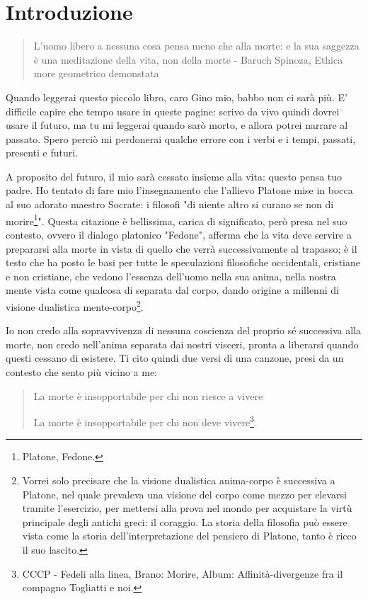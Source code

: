 \chapter*{Introduzione}

\begin{quotation}
	\small L'uomo libero a nessuna cosa pensa meno che alla morte: e la sua saggezza è una meditazione della vita, non della morte - Baruch Spinoza, Ethica more geometrico demonstata
\end{quotation}

Quando leggerai questo piccolo libro, caro Gino mio, babbo non ci sarà più. E' difficile capire che tempo usare in queste pagine: scrivo da vivo quindi dovrei usare il futuro, ma tu mi leggerai quando sarò morto, e allora potrei narrare al passato. Spero perciò mi perdonerai qualche errore con i verbi e i tempi, passati, presenti e futuri.

A proposito del futuro, il mio sarà cessato insieme alla vita: questo pensa tuo padre. Ho tentato di fare mio l'insegnamento che l'allievo Platone mise in bocca al suo adorato maestro Socrate: i filosofi "di niente altro si curano se non di morire\footnote{Platone, Fedone.}". Questa citazione è bellissima, carica di significato, però presa nel suo contesto, ovvero il dialogo platonico "Fedone", afferma che la vita deve servire a prepararsi alla morte in vista di quello che verrà successivamente al trapasso; è il testo che ha posto le basi per tutte le speculazioni filosofiche occidentali, cristiane e non cristiane, che vedono l'essenza dell'uomo nella sua anima, nella nostra mente vista come qualcosa di separata dal corpo, dando origine a millenni di visione dualistica mente-corpo\footnote{Vorrei solo precisare che la visione dualistica anima-corpo è successiva a Platone, nel quale prevaleva una visione del corpo come mezzo per elevarsi tramite l'esercizio, per mettersi alla prova nel mondo per acquistare la virtù principale degli antichi greci: il coraggio. La storia della filosofia può essere vista come la storia dell'interpretazione del pensiero di Platone, tanto è ricco il suo lascito.}. 

Io non credo alla sopravvivenza di nessuna coscienza del proprio sé successiva alla morte, non credo nell'anima separata dai nostri visceri, pronta a liberarsi quando questi cessano di esistere. Ti cito quindi due versi di una canzone, presi da un contesto che sento più vicino a me:

\begin{quotation}
	\small La morte è insopportabile per chi non riesce a vivere
	
	La morte è insopportabile per chi non deve vivere\footnote{CCCP - Fedeli alla linea, Brano: Morire, Album: Affinità-divergenze fra il compagno Togliatti e noi. }.
\end{quotation}

